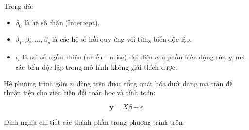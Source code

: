 Trong đó:

\begin{itemize}[topsep=0pt, itemsep=2.5pt, leftmargin=1.5cm]
    \item $\beta_0$ là hệ số chặn (Intercept).
    \item $\beta_1, \beta_2, \dots, \beta_p$ là các hệ số hồi quy ứng với từng biến độc lập.
    \item $\epsilon_i$ là sai số ngẫu nhiên (nhiễu - noise) đại diện cho phần biến động của $y_i$ mà các biến độc lập trong mô hình không giải thích được.
\end{itemize}

Hệ phương trình gồm $n$ dòng trên được tổng quát hóa dưới dạng ma trận để thuận tiện cho việc biến đổi toán học và tính toán:

\begin{equation}
    \mathbf{y} = X\beta + \epsilon
\end{equation}

Định nghĩa chi tiết các thành phần trong phương trình trên:


